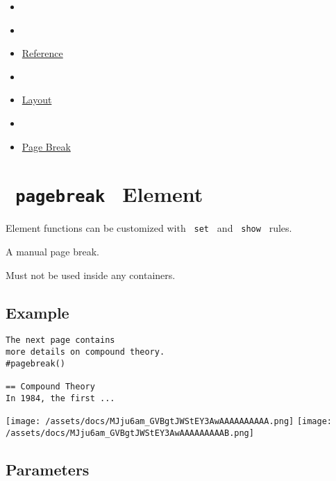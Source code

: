 \begin{itemize}
\tightlist
\item
  \href{/docs}{}
\item
  
\item
  \href{/docs/reference/}{Reference}
\item
  
\item
  \href{/docs/reference/layout/}{Layout}
\item
  
\item
  \href{/docs/reference/layout/pagebreak/}{Page Break}
\end{itemize}

\section{\texorpdfstring{\texttt{\ pagebreak\ } {{ Element
}}}{ pagebreak   Element }}\label{summary}

\label{element-tooltip}
Element functions can be customized with \texttt{\ set\ } and
\texttt{\ show\ } rules.

A manual page break.

Must not be used inside any containers.

\subsection{Example}\label{example}

\begin{verbatim}
The next page contains
more details on compound theory.
#pagebreak()

== Compound Theory
In 1984, the first ...
\end{verbatim}

\texttt{[image: /assets/docs/MJju6am\_GVBgtJWStEY3AwAAAAAAAAAA.png]}
\texttt{[image: /assets/docs/MJju6am\_GVBgtJWStEY3AwAAAAAAAAAB.png]}

\subsection{\texorpdfstring{{ Parameters
}}{ Parameters }}\label{parameters}

